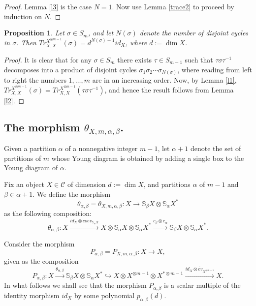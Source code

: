 \documentclass{amsart}
\newtheorem{proposition}[theorem]{Proposition}
\theoremstyle{definition}
\newcommand{\ot}{\otimes}
\newcommand{\C}{{\mathcal C}}
\begin{document}
\begin{proof}
Lemma \ref{l3} is the case $N=1$. Now use Lemma \ref{trace2} to
proceed by induction on $N$.
\end{proof}

\begin{proposition}\label{c2}
Let $\sigma\in S_{m}$, and let $N(\sigma)$ denote the number of
disjoint cycles in $\sigma$. Then $Tr_{X,X}^{X^{\ot
m-1}}(\sigma)=d^{N(\sigma)-1}id_X$, where $d:=\dim X$.
\end{proposition}

\begin{proof}
It is clear that for any $\sigma\in S_{m}$ there exists $\tau\in
S_{m-1}$ such that $\tau\sigma\tau^{-1}$ decomposes into a product
of disjoint cycles $\sigma_1\sigma_2\cdots\sigma_{N(\sigma)}$, where
reading from left to right the numbers $1,\dots,m$ are in an
increasing order. Now, by Lemma \ref{l1}, $Tr_{X,X}^{X^{\ot m-1
}}(\sigma)=Tr_{X,X}^{X^{\ot m-1 }}(\tau\sigma\tau^{-1})$, and hence
the result follows from Lemma \ref{l2}.
\end{proof}

\subsection{The morphism $\theta_{X,m,\alpha,\beta}$.}
Given a partition $\alpha$ of a nonnegative integer $m-1$, let
$\alpha+1$ denote the set of partitions of $m$ whose Young diagram
is obtained by adding a single box to the Young diagram of $\alpha$.

Fix an object $X\in \C$ of dimension $d:=\dim X$, and partitions
$\alpha$ of $m-1$ and $\beta\in \alpha+1$. We define the morphism
$$\theta_{\alpha,\beta}=
\theta_{X,m,\alpha,\beta}:X\to \mathbb{S}_{\beta}X\ot
\mathbb{S}_{\alpha}X^*$$ as the following composition:
\begin{equation}\label{theta}
\theta_{\alpha,\beta}:X  \xrightarrow{id_X\ot
coev_{\mathbb{S}_{\alpha}X}} X\ot \mathbb{S}_{\alpha}X\ot
\mathbb{S}_{\alpha}X^* \xrightarrow{c_{\beta}\ot c_{\alpha}}
\mathbb{S}_{\beta}X\ot \mathbb{S}_{\alpha}X^*.
\end{equation}

Consider the morphism
\begin{equation*}\label{spinj}
P_{\alpha,\beta}=P_{X,m,\alpha,\beta}:X\to X,
\end{equation*}
given as the composition
\begin{equation}\label{spinj}
P_{\alpha,\beta}:X
\xrightarrow{\theta_{\alpha,\beta}}\mathbb{S}_{\beta}X\ot
\mathbb{S}_{\alpha}X^* \hookrightarrow X\ot X^{\ot m-1 }\ot X^{*\ot
m-1 } \xrightarrow{id_X\ot \widetilde{ev}_{X^{\ot m-1 }}} X.
\end{equation}
In what follows we shall see that the morphism $P_{\alpha,\beta}$ is
a scalar multiple of the identity morphism $id_X$ by some polynomial
$p_{\alpha,\beta}(d)$.
\end{document}

